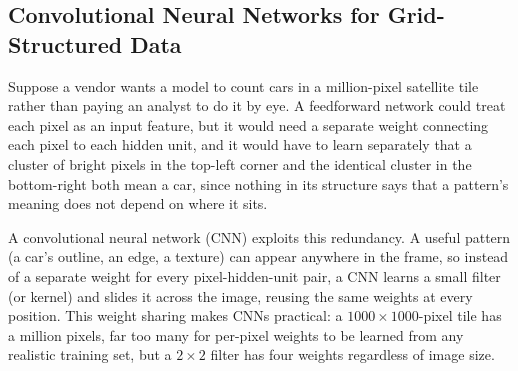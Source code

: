 \documentclass[../ai_in_finance]{subfiles}
\begin{document}
\subsection{Convolutional Neural Networks for Grid-Structured Data}
\label{sec:cnn-grid}

Suppose a vendor wants a model to count cars in a million-pixel satellite tile rather than paying an analyst to do it by eye. A feedforward network could treat each pixel as an input feature, but it would need a separate weight connecting each pixel to each hidden unit, and it would have to learn separately that a cluster of bright pixels in the top-left corner and the identical cluster in the bottom-right both mean a car, since nothing in its structure says that a pattern's meaning does not depend on where it sits.

A convolutional neural network (CNN) exploits this redundancy. A useful pattern (a car's outline, an edge, a texture) can appear anywhere in the frame, so instead of a separate weight for every pixel-hidden-unit pair, a CNN learns a small filter (or kernel) and slides it across the image, reusing the same weights at every position. This weight sharing makes CNNs practical: a $1000\times1000$-pixel tile has a million pixels, far too many for per-pixel weights to be learned from any realistic training set, but a $2\times2$ filter has four weights regardless of image size.
\end{document}

